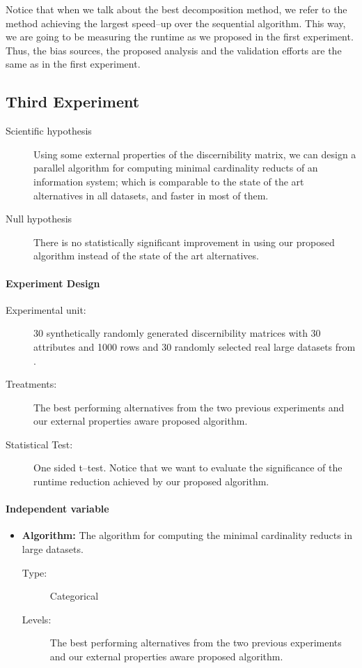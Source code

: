 \documentclass[11pt]{article}   %
\begin{document}
    Notice that when we talk about the best decomposition method, we refer to the method achieving the largest
    speed--up over the sequential algorithm. This way, we are going to be measuring the runtime as we proposed 
    in the first experiment. Thus, the bias sources, the proposed analysis and the validation efforts are the 
    same as in the first experiment.

\subsection{Third Experiment}
  \begin{description}
  \item[Scientific hypothesis] Using some external properties of the discernibility matrix, we can design a
  							   parallel algorithm for computing minimal cardinality reducts of an information
  							   system; which is comparable to the state of the art alternatives in all datasets,
  							   and faster in most of them.
  \item[Null hypothesis] There is no statistically significant improvement in using our proposed
  						 algorithm instead of the state of the art alternatives.
  \end{description}
  \paragraph{Experiment Design} 
	  \begin{description}
	  	\item[Experimental unit:] 30 synthetically randomly generated discernibility matrices with 30 attributes
	  							  and 1000 rows and 30 randomly selected real large datasets from \cite{Bache13}.
	  	\item[Treatments:] The best performing alternatives from the two previous experiments and our external 
	  					   properties aware proposed algorithm.
	  	\item[Statistical Test:] One sided t--test. Notice that we want to evaluate the significance of the
	  							 runtime reduction achieved by our proposed algorithm.
	  \end{description}
  \paragraph{Independent variable}  
  	\begin{itemize}
  		\item \textbf{Algorithm:} The algorithm for computing the minimal cardinality reducts in large datasets.
  	   		\begin{description}
  	   			\item[Type:] Categorical
  	   			\item[Levels:] The best performing alternatives from the two previous experiments and our external 
	  					   	   properties aware proposed algorithm.
  	   		\end{description}
    \end{itemize}
\end{document}
